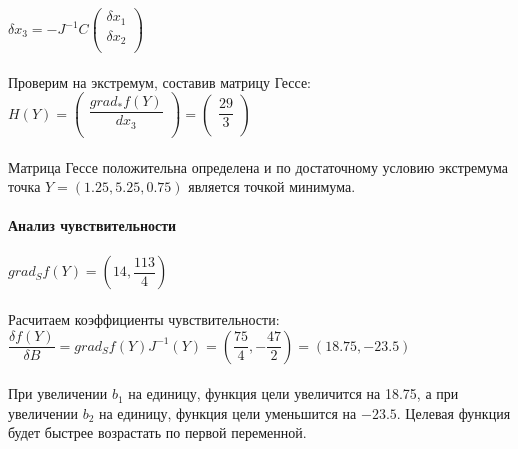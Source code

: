 \documentclass[14pt,a4paper,fleqn]{extarticle}
\begin{document}
	$\delta x_3 = -J^{-1} C \begin{pmatrix}
		\delta x_1\\
		\delta x_2\\
	\end{pmatrix}$\\\\
	Проверим на экстремум, составив матрицу Гессе:\\
	$H(Y) = \begin{pmatrix}
		\dfrac{grad_*f(Y)}{dx_3}\\
	\end{pmatrix} = 
	\begin{pmatrix}
		\dfrac{29}{3}\\
	\end{pmatrix}$\\\\
	Матрица Гессе положительна определена и по достаточному условию экстремума точка $Y = (1.25, 5.25, 0.75)$ является точкой минимума.\\\\
	\textbf{Анализ чувствительности}\\\\
	$grad_S f(Y) = (14, \dfrac{113}{4})$\\\\
	Расчитаем коэффициенты чувствительности:\\
	$\dfrac{\delta f(Y)}{\delta B} = grad_S f(Y)J^{-1}(Y) = (\dfrac{75}{4}, -\dfrac{47}{2}) = (18.75, -23.5)$\\\\
	При увеличении $b_1$ на единицу, функция цели увеличится на 18.75, а при увеличении $b_2$ на единицу, функция цели уменьшится на $-23.5$. Целевая функция будет быстрее возрастать по первой переменной.
\end{document}
